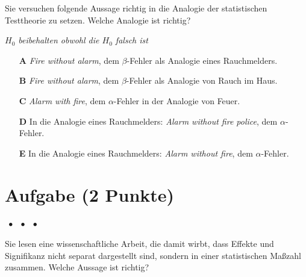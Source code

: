 \documentclass[a4paper, 9pt]{scrartcl}\usepackage[]{graphicx}\usepackage[]{xcolor}
\begin{document}
Sie versuchen folgende Aussage richtig in die Analogie der statistischen Testtheorie zu setzen. Welche Analogie ist richtig?

\begin{center}
\textit{$H_0$ beibehalten obwohl die $H_0$ falsch ist}
\end{center}



\begin{enumerate}
\item [\textbf{A} \msquare] \textit{Fire without alarm}, dem $\beta$-Fehler als Analogie eines Rauchmelders.
\item [\textbf{B} \msquare] \textit{Fire without alarm}, dem $\beta$-Fehler als Analogie von Rauch im Haus.
\item [\textbf{C} \msquare] \textit{Alarm with fire}, dem $\alpha$-Fehler in der Analogie von Feuer.
\item [\textbf{D} \msquare] In die Analogie eines Rauchmelders: \textit{Alarm without fire police}, dem $\alpha$-Fehler.
\item [\textbf{E} \msquare] In die Analogie eines Rauchmelders: \textit{Alarm without fire}, dem $\alpha$-Fehler.
\end{enumerate}

\section{Aufgabe \hfill (2 Punkte)}

\ifcollection
\begin{flushright}
\tiny\vspace{-2Ex}
\textbf{\examinhaltstart}
\exammodulestat $\;\bullet$
\exammodulestatbbv $\;\bullet$
\exammodulestatversuch $\;\bullet$
\exammodulebiostat
\vspace{-1Ex}
\end{flushright}
\fi




Sie lesen eine wissenschaftliche Arbeit, die damit wirbt, dass Effekte und Signifikanz nicht separat dargestellt sind, sondern in einer statistischen Maßzahl zusammen. Welche Aussage ist richtig?
\end{document}
